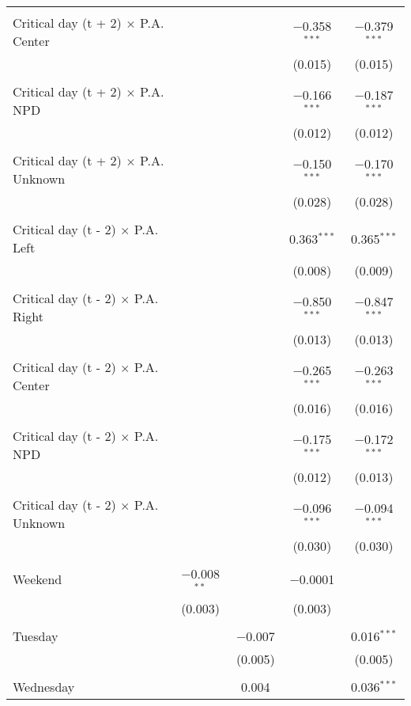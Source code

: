 \documentclass[
]{article}
\begin{document}
\begin{table}[!htbp]
{\begin{tabular}{@{\extracolsep{5pt}}lcccc}
  & & & & \\ 
 Critical day (t + 2) $\times$ P.A. Center &  &  & $-$0.358$^{***}$ & $-$0.379$^{***}$ \\ 
  &  &  & (0.015) & (0.015) \\ 
  & & & & \\ 
 Critical day (t + 2) $\times$ P.A. NPD &  &  & $-$0.166$^{***}$ & $-$0.187$^{***}$ \\ 
  &  &  & (0.012) & (0.012) \\ 
  & & & & \\ 
 Critical day (t + 2) $\times$ P.A. Unknown &  &  & $-$0.150$^{***}$ & $-$0.170$^{***}$ \\ 
  &  &  & (0.028) & (0.028) \\ 
  & & & & \\ 
 Critical day (t - 2) $\times$ P.A. Left &  &  & 0.363$^{***}$ & 0.365$^{***}$ \\ 
  &  &  & (0.008) & (0.009) \\ 
  & & & & \\ 
 Critical day (t - 2) $\times$ P.A. Right &  &  & $-$0.850$^{***}$ & $-$0.847$^{***}$ \\ 
  &  &  & (0.013) & (0.013) \\ 
  & & & & \\ 
 Critical day (t - 2) $\times$ P.A. Center &  &  & $-$0.265$^{***}$ & $-$0.263$^{***}$ \\ 
  &  &  & (0.016) & (0.016) \\ 
  & & & & \\ 
 Critical day (t - 2) $\times$ P.A. NPD &  &  & $-$0.175$^{***}$ & $-$0.172$^{***}$ \\ 
  &  &  & (0.012) & (0.013) \\ 
  & & & & \\ 
 Critical day (t - 2) $\times$ P.A. Unknown &  &  & $-$0.096$^{***}$ & $-$0.094$^{***}$ \\ 
  &  &  & (0.030) & (0.030) \\ 
  & & & & \\ 
 Weekend & $-$0.008$^{**}$ &  & $-$0.0001 &  \\ 
  & (0.003) &  & (0.003) &  \\ 
  & & & & \\ 
 Tuesday &  & $-$0.007 &  & 0.016$^{***}$ \\ 
  &  & (0.005) &  & (0.005) \\ 
  & & & & \\ 
 Wednesday &  & 0.004 &  & 0.036$^{***}$ \\ 

\end{tabular}}
\end{table}
\end{document}
